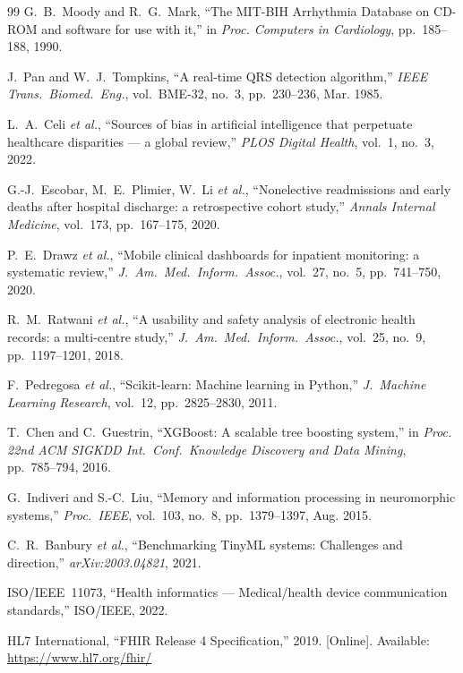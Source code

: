 \documentclass[12pt,a4paper]{article}
\begin{document}
\begin{thebibliography}{99}
G.~B.~Moody and R.~G.~Mark, ``The MIT-BIH Arrhythmia Database on CD-ROM and software for use with it,'' in \textit{Proc. Computers in Cardiology}, pp.~185--188, 1990.

J.~Pan and W.~J.~Tompkins, ``A real-time QRS detection algorithm,'' \textit{IEEE Trans.\ Biomed.\ Eng.}, vol.~BME-32, no.~3, pp.~230--236, Mar. 1985.

L.~A.~Celi \textit{et al.}, ``Sources of bias in artificial intelligence that perpetuate healthcare disparities — a global review,'' \textit{PLOS Digital Health}, vol.~1, no.~3, 2022.

G.-J.~Escobar, M.~E.~Plimier, W.~Li \textit{et al.}, ``Nonelective readmissions and early deaths after hospital discharge: a retrospective cohort study,'' \textit{Annals Internal Medicine}, vol.~173, pp.~167--175, 2020.

P.~E.~Drawz \textit{et al.}, ``Mobile clinical dashboards for inpatient monitoring: a systematic review,'' \textit{J.\ Am.\ Med.\ Inform.\ Assoc.}, vol.~27, no.~5, pp.~741--750, 2020.

R.~M.~Ratwani \textit{et al.}, ``A usability and safety analysis of electronic health records: a multi-centre study,'' \textit{J.\ Am.\ Med.\ Inform.\ Assoc.}, vol.~25, no.~9, pp.~1197--1201, 2018.

F.~Pedregosa \textit{et al.}, ``Scikit-learn: Machine learning in Python,'' \textit{J.\ Machine Learning Research}, vol.~12, pp.~2825--2830, 2011.

T.~Chen and C.~Guestrin, ``XGBoost: A scalable tree boosting system,'' in \textit{Proc. 22nd ACM SIGKDD Int.\ Conf.\ Knowledge Discovery and Data Mining}, pp.~785--794, 2016.

G.~Indiveri and S.-C.~Liu, ``Memory and information processing in neuromorphic systems,'' \textit{Proc.\ IEEE}, vol.~103, no.~8, pp.~1379--1397, Aug. 2015.

C.~R.~Banbury \textit{et al.}, ``Benchmarking TinyML systems: Challenges and direction,'' \textit{arXiv:2003.04821}, 2021.

ISO/IEEE~11073, ``Health informatics — Medical/health device communication standards,'' ISO/IEEE, 2022.

HL7 International, ``FHIR Release 4 Specification,'' 2019. [Online]. Available: \url{https://www.hl7.org/fhir/}


\end{thebibliography}
\end{document}
